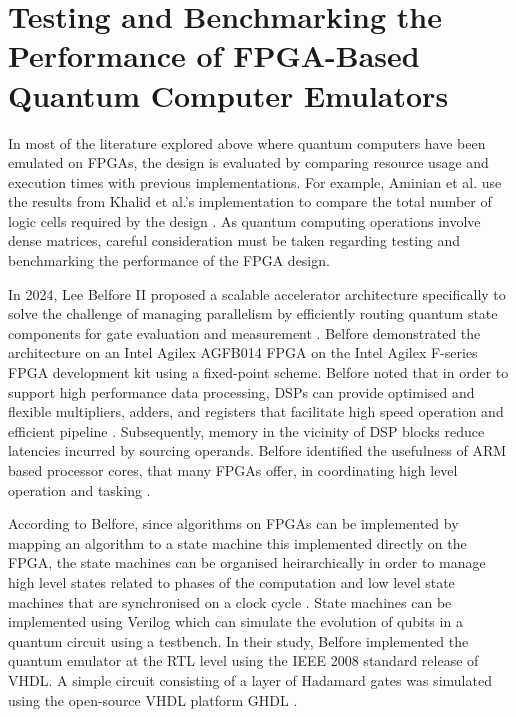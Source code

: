 \section{Testing and Benchmarking the Performance of FPGA-Based Quantum Computer Emulators}

In most of the literature explored above where quantum computers have been emulated on FPGAs, the design is evaluated by comparing resource usage and execution times with previous implementations. For example, Aminian et al. use the results from Khalid et al.'s implementation to compare the total number of logic cells required by the design \cite{Aminian2008, Khalid2004}. As quantum computing operations involve dense matrices, careful consideration must be taken regarding testing and benchmarking the performance of the FPGA design. 

In 2024, Lee Belfore II proposed a scalable accelerator architecture specifically to solve the challenge of managing parallelism by efficiently routing quantum state components for gate evaluation and measurement \cite{belfore2024scalable}. Belfore demonstrated the architecture on an Intel Agilex AGFB014 FPGA on the Intel Agilex F-series FPGA development kit using a fixed-point scheme. Belfore noted that in order to support high performance data processing, DSPs can provide optimised and flexible multipliers, adders, and registers that facilitate high speed operation and efficient pipeline \cite{belfore2024scalable}. Subsequently, memory in the vicinity of DSP blocks reduce latencies incurred by sourcing operands. Belfore identified the usefulness of ARM based processor cores, that many FPGAs offer, in coordinating high level operation and tasking \cite{belfore2024scalable}. 

According to Belfore, since algorithms on FPGAs can be implemented by mapping an algorithm to a state machine this implemented directly on the FPGA, the state machines can be organised heirarchically in order to manage high level states related to phases of the computation and low level state machines that are synchronised on a clock cycle \cite{belfore2024scalable}. State machines can be implemented using Verilog which can simulate the evolution of qubits in a quantum circuit using a testbench. In their study, Belfore implemented the quantum emulator at the RTL level using the IEEE 2008 standard release of VHDL. A simple circuit consisting of a layer of Hadamard gates was simulated using the open-source VHDL platform GHDL \cite{belfore2024scalable}. 

